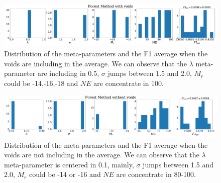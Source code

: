 \documentclass[usenatbib]{mnras}
\begin{document}
\begin{figure}
\centering
    \includegraphics[scale=0.23]{Figs/p_features_Forest_F1_av.pdf}
    \caption{Distribution of the meta-parameters and the F1 average when the voids are including in the average. We can observe that the $\lambda$ meta-parameter are including in 0.5, $\sigma$ jumps between 1.5 and 2.0, $M_r$ could be -14,-16,-18 and $NE$ are concentrate in 100.}
    \label{fig:features_void}    
\end{figure}

\begin{figure}
\centering
    \includegraphics[scale=0.23]{Figs/p_features_Forest_F1_av_no_voids.pdf}
    \caption{Distribution of the meta-parameters and the F1 average when the voids are not including in the average. We can observe that the $\lambda$ meta-parameter is centered in 0.1, mainly, $\sigma$ jumps between 1.5 and 2.0, $M_r$ could be -14 or -16 and $NE$ are concentrate in 80-100.}
    \label{fig:features_no_void}    
\end{figure}
\end{document}

